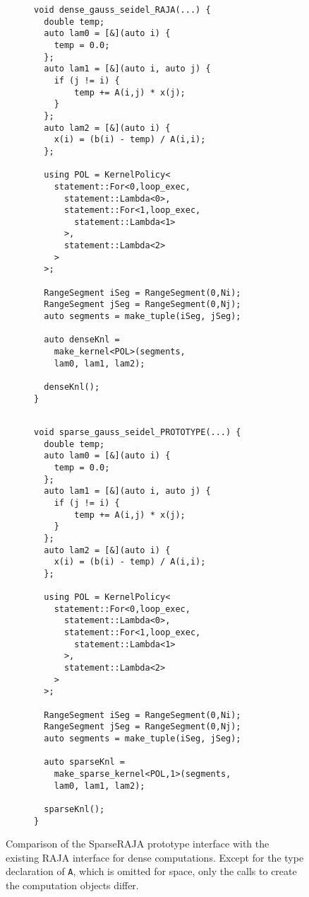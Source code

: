 \begin{figure*}
\begin{subfigure}{0.48\columnwidth}
\begin{lstlisting}[caption={RAJA implementation of dense Gauss-Seidel iterative solve. This version creates a computation object rather than executing immediately.}]
void dense_gauss_seidel_RAJA(...) {
  double temp;
  auto lam0 = [&](auto i) {
    temp = 0.0;
  };
  auto lam1 = [&](auto i, auto j) {
    if (j != i) {
        temp += A(i,j) * x(j);
    }
  };
  auto lam2 = [&](auto i) {
    x(i) = (b(i) - temp) / A(i,i);
  };

  using POL = KernelPolicy<
    statement::For<0,loop_exec,
      statement::Lambda<0>,
      statement::For<1,loop_exec,
        statement::Lambda<1>
      >,
      statement::Lambda<2>
    >
  >;
  
  RangeSegment iSeg = RangeSegment(0,Ni);
  RangeSegment jSeg = RangeSegment(0,Nj);
  auto segments = make_tuple(iSeg, jSeg);

  auto denseKnl = 
    make_kernel<POL>(segments, 
    lam0, lam1, lam2);

  denseKnl();
}
  
\end{lstlisting}
\end{subfigure}
\hspace{0.02\columnwidth}
\begin{subfigure}{0.48\columnwidth}
\begin{lstlisting}[caption={Implementation of sparse Gauss-Seidel iterative solve using the SparseRAJA prototype. The template argument on line 30 marks the lambda to use for symbolic evaluation.}]
void sparse_gauss_seidel_PROTOTYPE(...) {
  double temp;
  auto lam0 = [&](auto i) {
    temp = 0.0;
  };
  auto lam1 = [&](auto i, auto j) {
    if (j != i) {
        temp += A(i,j) * x(j);
    }
  };
  auto lam2 = [&](auto i) {
    x(i) = (b(i) - temp) / A(i,i);
  };

  using POL = KernelPolicy<
    statement::For<0,loop_exec,
      statement::Lambda<0>,
      statement::For<1,loop_exec,
        statement::Lambda<1>
      >,
      statement::Lambda<2>
    >
  >;
  
  RangeSegment iSeg = RangeSegment(0,Ni);
  RangeSegment jSeg = RangeSegment(0,Nj);
  auto segments = make_tuple(iSeg, jSeg);

  auto sparseKnl = 
    make_sparse_kernel<POL,1>(segments, 
    lam0, lam1, lam2);

  sparseKnl();
}
\end{lstlisting}
\end{subfigure}

\caption{Comparison of the SparseRAJA prototype interface with the existing RAJA interface for dense computations. Except for the type declaration of \texttt{A}, which is omitted for space, only the calls to create the computation objects differ.}\label{DenseSparseComparison}
\end{figure*}

